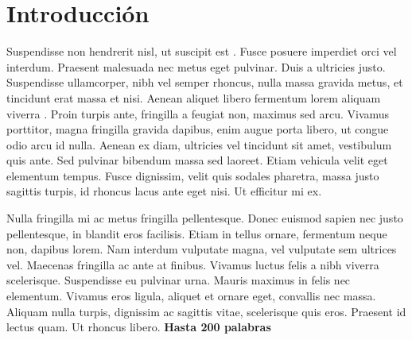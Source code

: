 \section{Introducción}
%
Suspendisse non hendrerit nisl, ut suscipit est \cite{Ade:2014xna}. Fusce posuere imperdiet orci vel interdum. Praesent malesuada nec metus eget pulvinar. Duis a ultricies justo. Suspendisse ullamcorper, nibh vel semper rhoncus, nulla massa gravida metus, et tincidunt erat massa et nisi. Aenean aliquet libero fermentum lorem aliquam viverra \cite{blackholes}. Proin turpis ante, fringilla a feugiat non, maximus sed arcu. Vivamus porttitor, magna fringilla gravida dapibus, enim augue porta libero, ut congue odio arcu id nulla. Aenean ex diam, ultricies vel tincidunt sit amet, vestibulum quis ante. Sed pulvinar bibendum massa sed laoreet. Etiam vehicula velit eget elementum tempus. Fusce dignissim, velit quis sodales pharetra, massa justo sagittis turpis, id rhoncus lacus ante eget nisi. Ut efficitur mi ex.

Nulla fringilla mi ac metus fringilla pellentesque. Donec euismod sapien nec justo pellentesque, in blandit eros facilisis. Etiam in tellus ornare, fermentum neque non, dapibus lorem. Nam interdum vulputate magna, vel vulputate sem ultrices vel. Maecenas fringilla ac ante at finibus. Vivamus luctus felis a nibh viverra scelerisque. Suspendisse eu pulvinar urna. Mauris maximus in felis nec elementum. Vivamus eros ligula, aliquet et ornare eget, convallis nec massa. Aliquam nulla turpis, dignissim ac sagittis vitae, scelerisque quis eros. Praesent id lectus quam. Ut rhoncus libero. {\bf \Large Hasta 200 palabras}